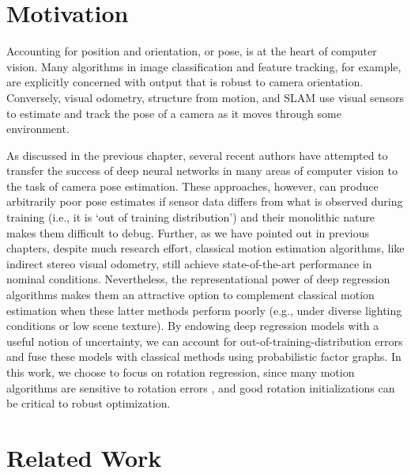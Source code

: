 \section{Motivation}
Accounting for position and orientation, or pose, is at the heart of computer vision. Many algorithms in image classification and feature tracking, for example, are explicitly concerned with output that is robust to camera orientation. Conversely, visual odometry, structure from motion, and SLAM use visual sensors to estimate and track the pose of a camera as it moves through some environment. 

 
As discussed in the previous chapter, several recent authors  \citep{Clark2017, Melekhov2017-dl, Kendall2015-ew} have attempted to  transfer the success of deep neural networks in many areas of computer vision to the task of camera pose estimation. These approaches, however, can produce arbitrarily poor pose estimates if sensor data differs from what is observed during training (i.e., it is `out of training distribution') and their monolithic nature makes them difficult to debug. Further, as we have pointed out in previous chapters, despite much research effort, classical motion estimation algorithms, like indirect stereo visual odometry, still achieve state-of-the-art performance in nominal conditions. Nevertheless, the representational power of deep regression algorithms makes them an attractive option to complement classical motion estimation when these latter methods perform poorly (e.g., under diverse lighting conditions or low scene texture). By endowing deep regression models with a useful notion of uncertainty, we can account for out-of-training-distribution errors and fuse these models with classical methods using probabilistic factor graphs. In this work, we choose to focus on rotation regression, since many motion algorithms are sensitive to rotation errors \citep{2018_Peretroukhin_Inferring,Olson2003-ax}, and good rotation initializations can be critical to robust optimization. 








\section{Related Work}

